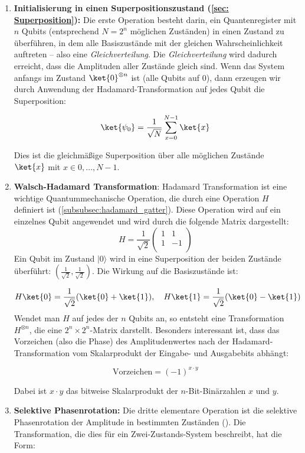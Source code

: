 \begin{enumerate}
    \item \textbf{Initialisierung in einen Superpositionszustand (\ref{sec: Superposition}):} 
    Die erste Operation besteht darin, ein Quantenregister mit $n$ Qubits (entsprechend $N = 2^{n}$ möglichen Zuständen) in einen Zustand zu überführen, in dem alle Basiszustände mit der gleichen Wahrscheinlichkeit auftreten – also eine \textit{Gleichverteilung}. Die \textit{Gleichverteilung} wird dadurch erreicht, dass die Amplituden aller Zustände gleich sind. Wenn das System anfangs im Zustand $\ket{0}^{\otimes n}$ ist (alle Qubits auf 0), dann erzeugen wir durch Anwendung der Hadamard-Transformation auf jedes Qubit die Superposition:

$$
\ket{\psi_0} = \frac{1}{\sqrt{N}} \sum_{x=0}^{N-1} \ket{x}
$$

Dies ist die gleichmäßige Superposition über alle möglichen Zustände $\ket{x}$ mit $x \in {0, \ldots, N-1}$.\\
    \item \textbf{Walsch-Hadamard Transformation}: Hadamard Transformation ist eine wichtige Quantummechanische Operation, die durch eine Operation $H$ definiert ist (\ref{subsubsec:hadamard_gatter}). Diese Operation wird auf ein einzelnes Qubit angewendet und wird durch die folgende Matrix dargestellt:
    $$
H = \frac{1}{\sqrt{2}} \begin{pmatrix}
1 & 1 \\
1 & -1 \\
\end{pmatrix}
$$
Ein Qubit im Zustand \( \lvert 0 \rangle \) wird in eine Superposition der beiden Zustände überführt: \( \left( \frac{1}{\sqrt{2}}, \frac{1}{\sqrt{2}} \right) \). Die Wirkung auf die Basiszustände ist:

$$
H\ket{0} = \frac{1}{\sqrt{2}}(\ket{0} + \ket{1}), \quad H\ket{1} = \frac{1}{\sqrt{2}}(\ket{0} - \ket{1})
$$
Wendet man $H$ auf jedes der $n$ Qubits an, so entsteht eine Transformation $H^{\otimes n}$, die eine $2^n \times 2^n$-Matrix darstellt.
Besonders interessant ist, dass das Vorzeichen (also die Phase) des Amplitudenwertes nach der Hadamard-Transformation vom Skalarprodukt der Eingabe- und Ausgabebits abhängt:

$$
\text{Vorzeichen} = (-1)^{x \cdot y}
$$

Dabei ist $x \cdot y$ das bitweise Skalarprodukt der $n$-Bit-Binärzahlen $x$ und $y$.\\

    \item \textbf{Selektive Phasenrotation:} Die dritte elementare Operation ist die selektive Phasenrotation der Amplitude in bestimmten Zuständen (\cite{zotero-1211}). Die Transformation, die dies für ein Zwei-Zustands-System beschreibt, hat die Form:


\end{enumerate}
